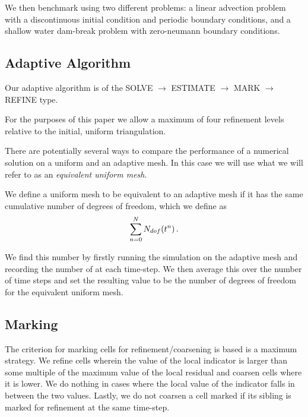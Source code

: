 \documentclass[final]{amsart}
\numberwithin{equation}{section}
\begin{document}
We then  benchmark using  two different problems: a linear advection problem with a discontinuous initial condition and periodic boundary conditions, and a shallow water dam-break problem with zero-neumann boundary conditions. 

\subsection{Adaptive Algorithm}
Our adaptive algorithm is of the  SOLVE $\to$ ESTIMATE $\to$ MARK $\to$ REFINE type.

\begin{Rem}
For the purposes of this paper we allow a maximum of  four  refinement levels relative to the initial, uniform triangulation. 
\end{Rem}
There are potentially several ways to compare the performance of a numerical solution on a uniform and an adaptive mesh.  In this case we will use what we will refer to as an \textit{equivalent uniform mesh}.
\begin{Defn}  \label{defn:equiv_uniform_mesh} We define a uniform mesh to be equivalent to an adaptive mesh if it has the same cumulative number of degrees of freedom, which we define as
	\begin{equation}
\sum_{n=0}^{N}N_{dof}\!\left({t^n}\right).
	\end{equation}
\end{Defn}
 We find this number by firstly running the simulation on the adaptive mesh and recording the number of  at each time-step.  We then average this over the number of time steps and set the resulting value to be the number of degrees of freedom for the equivalent uniform mesh.

\subsection{Marking}
The criterion for marking cells for refinement/coarsening is based is a maximum strategy.  We refine cells wherein  the value of the local indicator is larger than some multiple of the maximum value of the local residual and coarsen cells where it is lower.  We  do nothing in cases where the local value of the indicator falls in between the two values.  Lastly, we do not coarsen a cell marked if its sibling is marked for   refinement at the same time-step.
\end{document}
